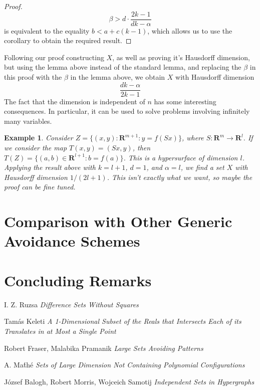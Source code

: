 \documentclass{article}
\theoremstyle{plain}
\newtheorem*{example}{Example}
\theoremstyle{plain}
\newtheorem{theorem}{Theorem}
\begin{document}
\begin{multicols}{2}
\begin{proof}
	\[ \beta > d \cdot \frac{2k - 1}{dk - \alpha} \]
	is equivalent to the equality $b < a + c(k-1)$, which allows us to use the corollary to obtain the required result.
\end{proof}

Following our proof constructing $X$, as well as proving it's Hausdorff dimension, but using the lemma above instead of the standard lemma, and replacing the $\beta$ in this proof with the $\beta$ in the lemma above, we obtain $X$ with Hausdorff dimension
%
\[ \frac{dk - \alpha}{2k - 1} \]
%
The fact that the dimension is independent of $n$ has some interesting consequences. In particular, it can be used to solve problems involving infinitely many variables.

\begin{example}
	Consider $Z = \{ (x,y): \mathbf{R}^{m+1}: y = f(Sx) \}$, where $S: \mathbf{R}^m \to \mathbf{R}^l$. If we consider the map $T(x,y) = (Sx,y)$, then $T(Z) = \{ (a,b) \in \mathbf{R}^{l+1}: b = f(a) \}$. This is a hypersurface of dimension $l$. Applying the result above with $k = l+1$, $d = 1$, and $\alpha = l$, we find a set $X$ with Hausdorff dimension $1/(2l + 1)$. This isn't exactly what we want, so maybe the proof can be fine tuned.
\end{example}


\section{Comparison with Other Generic Avoidance Schemes}

\section{Concluding Remarks}

\begin{thebibliography}{9}

I. Z. Ruzsa
\textit{Difference Sets Without Squares}

Tam\'{a}s Keleti
\textit{A 1-Dimensional Subset of the Reals that Intersects Each of its Translates in at Most a Single Point}

Robert Fraser, Malabika Pramanik
\textit{Large Sets Avoiding Patterns}

A. Ma\'{t}h\'{e}
\textit{Sets of Large Dimension Not Containing Polynomial Configurations}

J\'{o}zsef Balogh, Robert Morris, Wojceich Samotij
\textit{Independent Sets in Hypergraphs}

\end{thebibliography}

\end{multicols}
\end{document}

